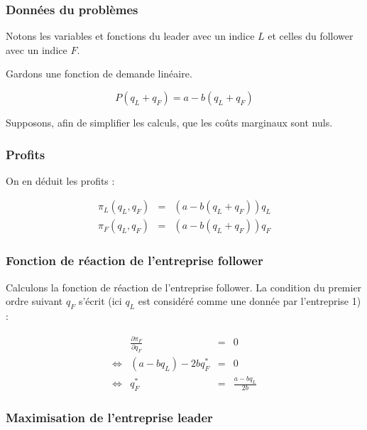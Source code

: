 \documentclass[
  a4paper,
]{book}
\theoremstyle{definition}
\theoremstyle{definition}
\theoremstyle{definition}
\theoremstyle{definition}
\theoremstyle{remark}
\begin{document}
\hypertarget{donnuxe9es-du-probluxe8mes}{%
\subsubsection{Données du problèmes}\label{donnuxe9es-du-probluxe8mes}}

Notons les variables et fonctions du leader avec un indice \(L\) et celles du follower avec un indice \(F\).

Gardons une fonction de demande linéaire.

\[
P(q_L+q_F) = a - b(q_L+q_F)
\]

Supposons, afin de simplifier les calculs, que les coûts marginaux sont nuls.

\hypertarget{profits-1}{%
\subsubsection{Profits}\label{profits-1}}

On en déduit les profits :

\[
\begin{array}{rcl}
\pi_L(q_L, q_F) &=& \left(a-b(q_L+q_F)\right)q_L\\
\pi_F(q_L, q_F) &=& \left(a-b(q_L+q_F)\right)q_F
\end{array}
\]

\hypertarget{fonction-de-ruxe9action-de-lentreprise-follower}{%
\subsubsection{Fonction de réaction de l'entreprise follower}\label{fonction-de-ruxe9action-de-lentreprise-follower}}

Calculons la fonction de réaction de l'entreprise follower.
La condition du premier ordre suivant \(q_F\) s'écrit (ici \(q_L\) est considéré comme une donnée par l'entreprise 1) :

\[
\begin{array}{crcl}
&\frac{\partial \pi_F}{\partial q_F}&=&0\\
\Leftrightarrow & (a-bq_L)-2bq_F^* &=& 0\\
\Leftrightarrow & q_F^* &=& \frac{a-bq_L}{2b}
\label{eq:FRFollower}
\end{array}
\]

\hypertarget{maximisation-de-lentreprise-leader}{%
\subsubsection{Maximisation de l'entreprise leader}\label{maximisation-de-lentreprise-leader}}
\end{document}
